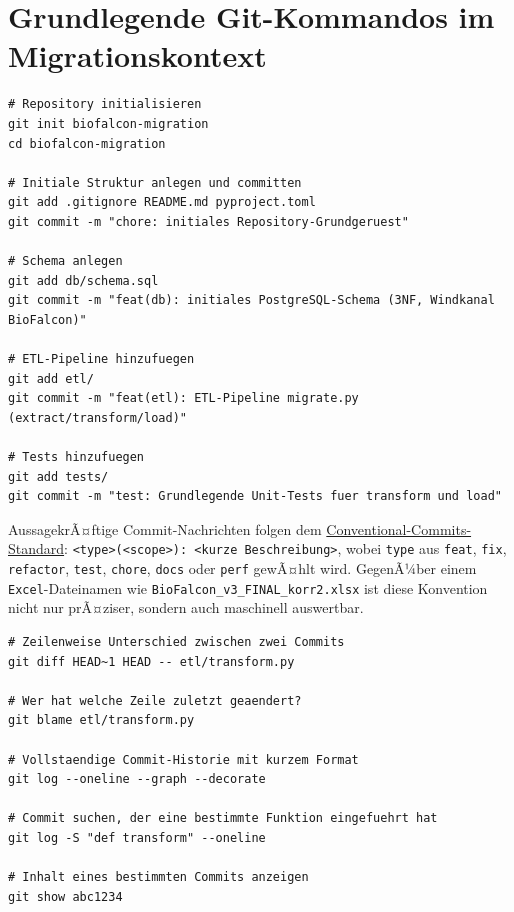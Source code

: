 ﻿\documentclass[12pt,a4paper]{report}
\theoremstyle{definition}
\theoremstyle{remark}
\newcommand{\excel}{\texttt{Excel}}
\newcommand{\code}[1]{\texttt{#1}}
\begin{document}
\section{Grundlegende Git-Kommandos im Migrationskontext}

\begin{lstlisting}[style=bash, caption={Repository initialisieren und Erstzustand sichern}]
# Repository initialisieren
git init biofalcon-migration
cd biofalcon-migration

# Initiale Struktur anlegen und committen
git add .gitignore README.md pyproject.toml
git commit -m "chore: initiales Repository-Grundgeruest"

# Schema anlegen
git add db/schema.sql
git commit -m "feat(db): initiales PostgreSQL-Schema (3NF, Windkanal BioFalcon)"

# ETL-Pipeline hinzufuegen
git add etl/
git commit -m "feat(etl): ETL-Pipeline migrate.py (extract/transform/load)"

# Tests hinzufuegen
git add tests/
git commit -m "test: Grundlegende Unit-Tests fuer transform und load"
\end{lstlisting}

AussagekrÃ¤ftige Commit-Nachrichten folgen dem
\href{https://www.conventionalcommits.org/}{Conventional-Commits-Standard}:
\code{<type>(<scope>): <kurze Beschreibung>}, wobei \code{type} aus
\code{feat}, \code{fix}, \code{refactor}, \code{test}, \code{chore},
\code{docs} oder \code{perf} gewÃ¤hlt wird.
GegenÃ¼ber einem \excel-Dateinamen wie \code{BioFalcon\_\newline v3\_FINAL\_korr2.xlsx}
ist diese Konvention nicht nur prÃ¤ziser, sondern auch maschinell auswertbar.

\begin{lstlisting}[style=bash, caption={Diff und Blame: Nachvollziehen von Aenderungen}]
# Zeilenweise Unterschied zwischen zwei Commits
git diff HEAD~1 HEAD -- etl/transform.py

# Wer hat welche Zeile zuletzt geaendert?
git blame etl/transform.py

# Vollstaendige Commit-Historie mit kurzem Format
git log --oneline --graph --decorate

# Commit suchen, der eine bestimmte Funktion eingefuehrt hat
git log -S "def transform" --oneline

# Inhalt eines bestimmten Commits anzeigen
git show abc1234
\end{lstlisting}
\end{document}
